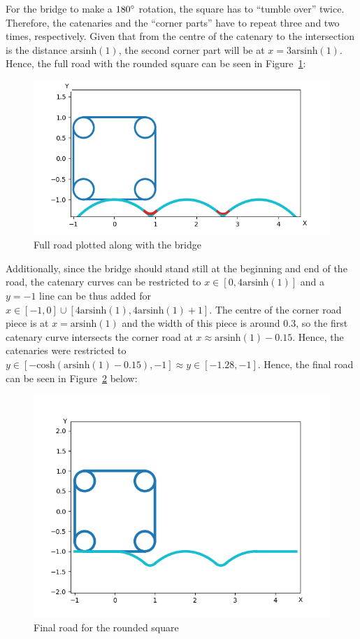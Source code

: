 \documentclass[12pt]{article}
\begin{document}
        For the bridge to make a $180\degree$ rotation, the square has to ``tumble over'' twice. Therefore, the catenaries and the ``corner parts'' have to repeat three and two times, respectively. Given that from the centre of the catenary to the intersection is the distance $\text{arsinh}(1)$, the second corner part will be at $x=3\text{arsinh}(1)$. Hence, the full road with the rounded square can be seen in Figure~\ref{fig:bridge_full}:
        \begin{figure}[H]
            \centering
            \includegraphics[width=0.75\linewidth]{images/road_with_square.png}
            \caption{Full road plotted along with the bridge}\label{fig:bridge_full}
        \end{figure}

        Additionally, since the bridge should stand still at the beginning and end of the road, the catenary curves can be restricted to $x \in [0, 4\text{arsinh}(1)]$ and a $y=-1$ line can be thus added for $x \in [-1, 0] \cup [4\text{arsinh}(1), 4\text{arsinh}(1)+1]$. The centre of the corner road piece is at $x=\text{arsinh}(1)$ and the width of this piece is around $0.3$, so the first catenary curve intersects the corner road at $x \approx \text{arsinh}(1) - 0.15$. Hence, the catenaries were restricted to $y\in [-\text{cosh}(\text{arsinh}(1) - 0.15), -1] \approx y \in [-1.28, -1]$. Hence, the final road can be seen in Figure~\ref{fig:bridge_final} below:

        \begin{figure}[H]
            \centering
            \includegraphics[width=0.9\linewidth]{images/road_square_final.png}
            \caption{Final road for the rounded square}\label{fig:bridge_final}
        \end{figure}
\end{document}
